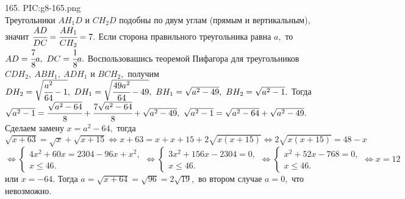 165. {{PIC:g8-165.png}}\\
Треугольники $AH_1D$ и $CH_2D$ подобны по двум углам (прямым и вертикальным), значит $\cfrac{AD}{DC}=\cfrac{AH_1}{CH_2}=7.$ Если сторона правильного треугольника равна $a,$ то $AD=\cfrac{7}{8}a,\ DC=\cfrac{1}{8}a.$ Воспользовашись теоремой Пифагора для треугольников $CDH_2,\ ABH_1,\ ADH_1$ и $BCH_2,$ получим $DH_2=\sqrt{\cfrac{a^2}{64}-1},\ DH_1=\sqrt{\cfrac{49a^2}{64}-49},\ BH_1=\sqrt{a^2-49},\ BH_2=\sqrt{a^2-1}.$ Тогда
$\sqrt{a^2-1}=\cfrac{\sqrt{a^2-64}}{8}+\cfrac{7\sqrt{a^2-64}}{8}+\sqrt{a^2-49},\
\sqrt{a^2-1}=\sqrt{a^2-64}+\sqrt{a^2-49}.$ Сделаем замену $x=a^2-64,$ тогда $\sqrt{x+63}=\sqrt{x}+\sqrt{x+15}\Leftrightarrow x+63=x+x+15+2\sqrt{x(x+15)}\Leftrightarrow 2\sqrt{x(x+15)}=48-x$\\$ \Leftrightarrow \begin{cases} 4x^2+60x=2304-96x+x^2,\\ x\leqslant 46.\end{cases}
\Leftrightarrow \begin{cases} 3x^2+156x-2304=0,\\ x\leqslant 46.\end{cases}
\Leftrightarrow \begin{cases} x^2+52x-768=0,\\ x\leqslant 46.\end{cases}\Leftrightarrow x=12$ или $x=-64.$
Тогда $a=\sqrt{x+64}=\sqrt{96}=2\sqrt{19},$ во втором случае $a=0,$ что невозможно.\newpage\noindent
